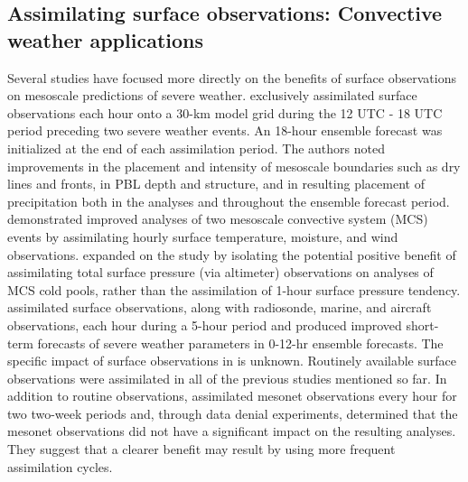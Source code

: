 \subsection{Assimilating surface observations: Convective weather applications}
Several studies have focused more directly on the benefits of surface observations on mesoscale predictions of severe weather. \citet{fujitaetal07} exclusively assimilated surface observations each hour onto a 30-km model grid during the 12 UTC - 18 UTC period preceding two severe weather events. An 18-hour ensemble forecast was initialized at the end of each assimilation period. The authors noted improvements in the placement and intensity of mesoscale boundaries such as dry lines and fronts, in PBL depth and structure, and in resulting placement of precipitation both in the analyses and throughout the ensemble forecast period. \citet{stensrudetal09b} demonstrated improved analyses of two mesoscale convective system (MCS) events by assimilating hourly surface temperature, moisture, and wind observations. \citet{wheatleystensrud10} expanded on the \citet{stensrudetal09b} study by isolating the potential positive benefit of assimilating total surface pressure (via altimeter) observations on analyses of MCS cold pools, rather than the assimilation of 1-hour surface pressure tendency. \citet{wheatleyetal12} assimilated surface observations, along with radiosonde, marine, and aircraft observations, each hour during a 5-hour period and produced improved short-term forecasts of severe weather parameters in 0-12-hr ensemble forecasts. The specific impact of surface observations in \citet{wheatleyetal12} is unknown. Routinely available surface observations were assimilated in all of the previous studies mentioned so far. In addition to routine observations, \citet{knopfmeierstensrud13} assimilated mesonet observations every hour for two two-week periods and, through data denial experiments, determined that the mesonet observations did not have a significant impact on the resulting analyses. They suggest that a clearer benefit may result by using more frequent assimilation cycles.

